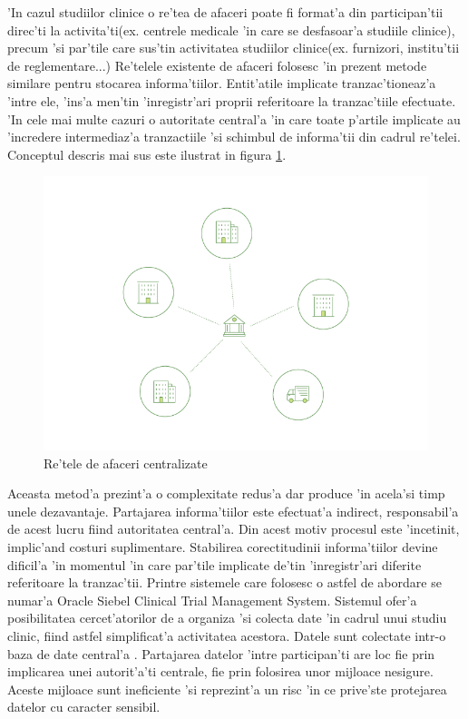\documentclass[12pt,a4paper,twoside]{report}
\begin{document}
	'In cazul studiilor clinice o re'tea de afaceri poate fi format'a din participan'tii direc'ti la activita'ti(ex. centrele medicale 'in care se desfasoar'a studiile clinice), precum 'si par'tile care sus'tin activitatea studiilor clinice(ex. furnizori, institu'tii de reglementare...)
	Re'telele existente de afaceri folosesc 'in prezent metode similare pentru stocarea informa'tiilor. Entit'atile implicate tranzac'tioneaz'a 'intre ele, 'ins'a men'tin 'inregistr'ari proprii referitoare la tranzac'tiile efectuate. 'In cele mai multe cazuri o autoritate central'a 'in care toate p'artile implicate au 'incredere intermediaz'a tranzactiile 'si schimbul de informa'tii din cadrul re'telei. Conceptul descris mai sus este ilustrat in figura \ref{fig:centralised}.\\	
		\begin{figure}[H]
		\begin{center}
			\includegraphics[scale=1.60]{img/current_network.png}
			\caption{Re'tele de afaceri centralizate\cite{fabricdoc}}
  			\label{fig:centralised}
  		\end{center}
  		\end{figure}
  		
	Aceasta metod'a prezint'a o complexitate redus'a dar produce 'in acela'si timp unele dezavantaje. Partajarea informa'tiilor este efectuat'a indirect, responsabil'a de acest lucru fiind autoritatea central'a. Din acest motiv procesul este 'incetinit, implic'and costuri suplimentare. Stabilirea corectitudinii informa'tiilor devine dificil'a 'in momentul 'in care par'tile implicate de'tin 'inregistr'ari diferite referitoare la tranzac'tii.
		Printre sistemele care folosesc o astfel de abordare se numar'a Oracle Siebel Clinical Trial Management System\cite{ctms}. Sistemul ofer'a posibilitatea cercet'atorilor de a organiza 'si colecta date 'in cadrul unui studiu clinic, fiind astfel simplificat'a activitatea acestora. Datele sunt colectate intr-o baza de date central'a . Partajarea datelor 'intre participan'ti are loc fie prin implicarea unei autorit'a'ti centrale, fie prin folosirea unor mijloace nesigure. Aceste mijloace sunt ineficiente 'si reprezint'a un risc 'in ce prive'ste protejarea datelor cu caracter sensibil.\\	
\end{document}
